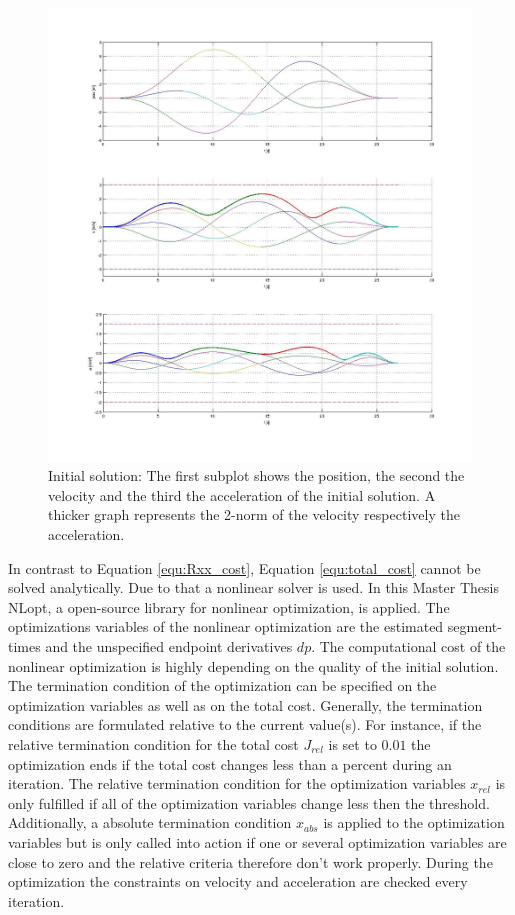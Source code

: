 \begin{figure}[h]
   \centering
   \includegraphics[width=1\textwidth]{pics/initial.jpg}
   \caption{Initial solution: The first subplot shows the position, the second the velocity and the third the acceleration of the initial solution. A thicker graph represents the 2-norm of the velocity respectively the acceleration.}
   \label{pic:initialSolution}
\end{figure}

In contrast to Equation \ref{equ:Rxx_cost}, Equation \ref{equ:total_cost} cannot be solved analytically. Due to that a nonlinear solver is used. In this Master Thesis NLopt,  a open-source library for nonlinear optimization, is applied. The optimizations variables of the nonlinear optimization are the estimated segment-times and the unspecified endpoint derivatives $dp$. The computational cost of the nonlinear optimization is highly depending on the quality of the initial solution. \newline
The termination condition of the optimization can be specified on the optimization variables as well as on the total cost. Generally, the termination conditions are formulated relative to the current value(s). For instance, if the relative termination condition for the total cost $J_{rel}$ is set to $0.01$ the optimization ends if the total cost changes less than a percent during an iteration. The relative termination condition for the optimization variables $x_{rel}$ is only fulfilled if all of the optimization variables change less then the threshold. Additionally, a absolute termination condition $x_{abs}$ is applied to the optimization variables but is only called into action if one or several optimization variables are close to zero and the relative criteria therefore don't work properly.
During the optimization the constraints on velocity and acceleration are checked every iteration. \newline

